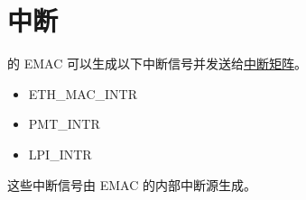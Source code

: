 \documentclass[main\_\_CN.tex]{subfiles}
\begin{document}

\section{中断}

\chipname{} 的 EMAC 可以生成以下中断信号并发送给\hyperref[mod:intmtrx]{中断矩阵}。

    \begin{itemize}
        \item ETH\_MAC\_INTR
        \item PMT\_INTR
        \item LPI\_INTR
    \end{itemize}

这些中断信号由 EMAC 的内部中断源生成。
\end{document}

